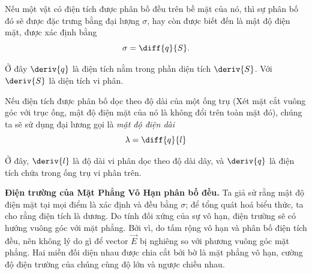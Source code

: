 Nếu một vật có điện tích được phân bố đều trên bề mặt của nó, thì sự phân bố đó sẽ được đặc trưng bằng đại lượng $\sigma$, hay còn được biết đến là mật độ điện mặt, được xác định bằng
\begin{equation}\label{eq:1_118}
	\sigma = \diff{q}{S}.
\end{equation}

\noindent
Ở đây $\deriv{q}$ là điện tích nằm trong phần diện tích $\deriv{S}$. Với $\deriv{S}$ là diện tích vi phân.

Nếu điện tích được phân bố dọc theo độ dài của một ống trụ (Xét mặt cắt vuông góc với trục ống, mật độ điện mặt của nó là không đổi trên toàn mặt đó), chúng ta sẽ sử dụng đại lương gọi là \textit{mật độ điện dài}
\begin{equation}\label{eq:1_119}
	\lambda = \diff{q}{l}
\end{equation}

\noindent
Ở đây, $\deriv{l}$ là độ dài vi phân dọc theo độ dài dây, và $\deriv{q}$ là điện tích chứa trong ống trụ vi phân trên.

\textbf{Điện trường của Mặt Phẳng Vô Hạn phân bố đều.} Ta giả sử rằng mật độ điện mặt tại mọi điểm là xác định và đều bằng $\sigma$; để tổng quát hoá biểu thức, ta cho rằng điện tích là dương. Do tính đối xứng của sự vô hạn, điện trường sẽ có hướng vuông góc với mặt phẳng. Bởi vì, do tấm rộng vô hạn và phân bố điện tích đều, nên không lý do gì để vector $\vec{E}$ bị nghiêng so với phương vuông góc mặt phẳng. Hai miền đối diện nhau được chia cắt bởi bờ là mặt phẳng vô hạn, cường độ điện trường của chúng cùng độ lớn và ngược chiều nhau.


